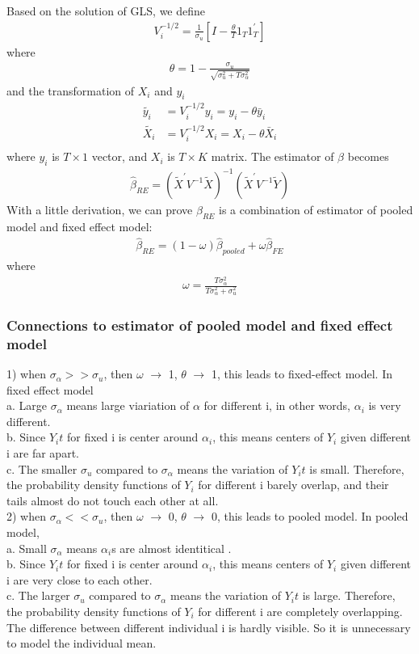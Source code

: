 \documentclass[a4paper]{article}
\begin{document}
Based on the solution of GLS, we define
\begin{align*}
V_i^{-1/2} = \frac{1}{\sigma_u}[I-\frac{\theta}{T} 1_T 1^{'}_T]
\end{align*}
where
\begin{align*}
\theta = 1 - \frac{\sigma_u}{\sqrt{\sigma^2_u + T \sigma^2_{\alpha}}}
\end{align*}
and the transformation of $X_i$ and $y_i$
\begin{align*}
\tilde{y_i} & = V_i^{-1/2}y_i = y_i - \theta \bar y_i\\
\tilde{X_{i}} & = V_i^{-1/2}X_{i} = X_i - \theta \bar X_i\\
\end{align*}
where $y_i$ is $T\times 1$ vector, and $X_{i}$ is $T \times K$ matrix.  The estimator of $\beta$ becomes
\begin{align*}
\hat \beta_{RE} = (\tilde X^{'}V^{-1}\tilde X)^{-1} (\tilde X^{'}V^{-1}\tilde Y)
\end{align*}
With a little derivation, we can prove $\beta_{RE}$ is a combination of estimator of pooled model and fixed effect model:
\begin{align*}
\hat \beta_{RE} = (1-\omega)\hat \beta_{pooled} + \omega \hat \beta_{FE}
\end{align*}
where
\begin{align*}
\omega = \frac{T\sigma^2_{\alpha}}{T\sigma^2_{\alpha} + \sigma^2_u}
\end{align*}
\subsubsection{Connections to estimator of pooled model and fixed effect model}
1) when $\sigma_{\alpha} >> \sigma_u$, then $\omega$ $\rightarrow$ 1, $\theta$ $\rightarrow$ 1,  this leads to fixed-effect model. In fixed effect model\\
a. Large $\sigma_{\alpha}$ means large viariation of $\alpha$ for different i, in other words, $\alpha_i$ is very different.\\
b. Since $Y_it$ for fixed i is center around $\alpha_i$, this means centers of $Y_i$ given different i are far apart.\\
c. The smaller $\sigma_u$ compared to $\sigma_{\alpha}$ means the variation of $Y_it$ is small. Therefore, the probability density functions of $Y_i$ for different i barely overlap, and their tails almost do not touch each other at all.\\
2) when $\sigma_{\alpha} << \sigma_u$, then $\omega$ $\rightarrow$ 0, $\theta$ $\rightarrow$ 0, this leads to pooled model. In pooled model,\\
a. Small $\sigma_{\alpha}$ means $\alpha_i$s are almost identitical .\\
b. Since $Y_it$ for fixed i is center around $\alpha_i$, this means centers of $Y_i$ given different i are very close to each other.\\
c. The larger $\sigma_u$ compared to $\sigma_{\alpha}$ means the variation of $Y_it$ is large. Therefore, the probability density functions of $Y_i$ for different i are completely overlapping. The difference between different individual i is hardly visible. So it is unnecessary to model the individual mean. \\
\end{document}
